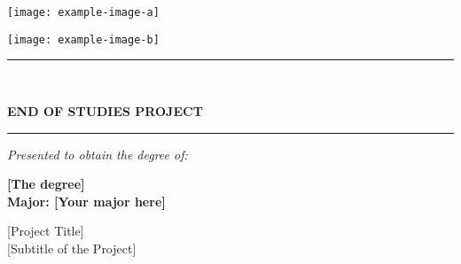 \begin{titlepage}
    \centering
    
    \begin{minipage}[t]{0.45\textwidth}
        \centering
        \texttt{[image: example-image-a]} %
    \end{minipage}%
    \hfill
    \begin{minipage}[t]{0.45\textwidth}
        \centering
        \texttt{[image: example-image-b]} %
    \end{minipage}

    \vspace{0.1cm}

    \begin{center}
        \rule{0.5\textwidth}{1pt}\\[0.2cm]
        {\fontsize{16}{18}\selectfont\bfseries END OF STUDIES PROJECT\par}
        \rule{0.5\textwidth}{1pt}
    \end{center}

    \vspace{0.1cm}
    
    {\large\itshape Presented to obtain the degree of:\par}
    \vspace{0.1cm}
    {\Large\bfseries [The degree]\\
    \vspace{0.1cm}
    Major: [Your major here]\par}

    \vspace{0.3cm}

    \begin{center}
        \begin{tcolorbox}[
            enhanced,
            colback=white,
            colframe=black!80,
            arc=3mm,
            boxrule=1pt,
            width=0.85\textwidth,
            halign=center,
            valign=center,
            fontupper=\fontsize{20}{24}\selectfont\bfseries,
            drop shadow,
            top=8pt,
            bottom=8pt,
            left=10pt,
            right=10pt
        ]
        \textcolor{black!90}{[Project Title]\\}
        \vspace{2pt}
        \fontsize{16}{20}\selectfont\textcolor{black!80}{[Subtitle of the Project]}
        \end{tcolorbox}
    \end{center}


\end{titlepage}

